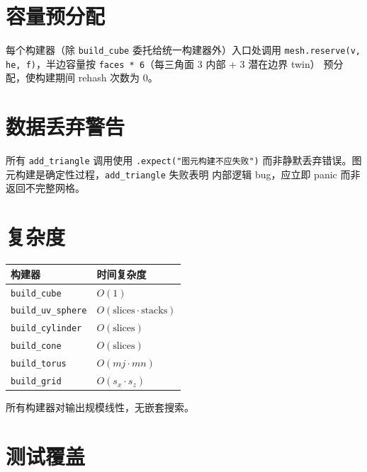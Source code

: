 \documentclass[11pt,a4paper]{article}
\begin{document}
\section{容量预分配}

每个构建器（除 \texttt{build\_cube} 委托给统一构建器外）入口处调用
\texttt{mesh.reserve(v, he, f)}，半边容量按 \texttt{faces * 6}（每三角面 3 内部 + 3 潜在边界 twin）
预分配，使构建期间 rehash 次数为 0。

\section{数据丢弃警告}

所有 \texttt{add\_triangle} 调用使用 \texttt{.expect("图元构建不应失败")}
而非静默丢弃错误。图元构建是确定性过程，\texttt{add\_triangle} 失败表明
内部逻辑 bug，应立即 panic 而非返回不完整网格。

\section{复杂度}

\begin{center}
\renewcommand{\arraystretch}{1.18}
\begin{tabular}{@{}ll@{}}
  \toprule
  \textbf{构建器} & \textbf{时间复杂度} \\
  \midrule
  \texttt{build\_cube}        & $O(1)$ \\
  \texttt{build\_uv\_sphere}  & $O(\text{slices} \cdot \text{stacks})$ \\
  \texttt{build\_cylinder}    & $O(\text{slices})$ \\
  \texttt{build\_cone}        & $O(\text{slices})$ \\
  \texttt{build\_torus}       & $O(mj \cdot mn)$ \\
  \texttt{build\_grid}        & $O(s_x \cdot s_z)$ \\
  \bottomrule
\end{tabular}
\end{center}

所有构建器对输出规模线性，无嵌套搜索。

\section{测试覆盖}
\end{document}

